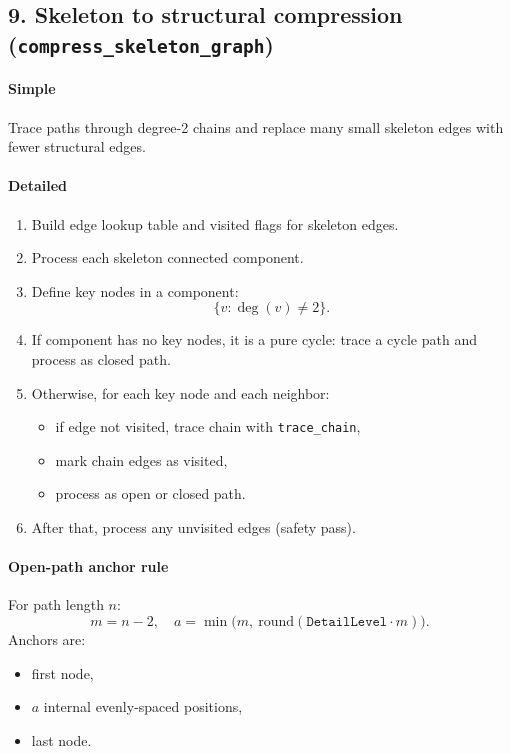 \documentclass[11pt]{article}
\begin{document}
\subsection*{9. Skeleton to structural compression (\texttt{compress\_skeleton\_graph})}
\paragraph{Simple}
Trace paths through degree-2 chains and replace many small skeleton edges with fewer structural edges.

\paragraph{Detailed}
\begin{enumerate}
  \item Build edge lookup table and visited flags for skeleton edges.
  \item Process each skeleton connected component.
  \item Define key nodes in a component:
  \[
  \{v : \deg(v)\neq 2\}.
  \]
  \item If component has no key nodes, it is a pure cycle:
  trace a cycle path and process as closed path.
  \item Otherwise, for each key node and each neighbor:
  \begin{itemize}
    \item if edge not visited, trace chain with \texttt{trace\_chain},
    \item mark chain edges as visited,
    \item process as open or closed path.
  \end{itemize}
  \item After that, process any unvisited edges (safety pass).
\end{enumerate}

\paragraph{Open-path anchor rule}
For path length \(n\):
\[
m = n-2, \quad a = \min\big(m,\ \mathrm{round}(\texttt{DetailLevel}\cdot m)\big).
\]
Anchors are:
\begin{itemize}
  \item first node,
  \item \(a\) internal evenly-spaced positions,
  \item last node.
\end{itemize}
\end{document}
